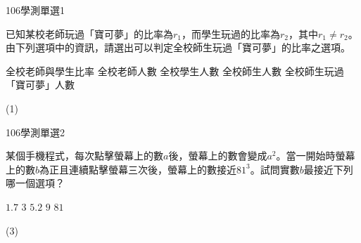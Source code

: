     \begin{QUESTION}
        \begin{ExamInfo}{106}{學測}{單選}{1}
        \end{ExamInfo}
        \begin{ExamAnsRateInfo}{53}{82}{52}{25}
        \end{ExamAnsRateInfo}
        \begin{QBODY}
            已知某校老師玩過「寶可夢」的比率為${{r}_{1}}$，而學生玩過的比率為${{r}_{2}}$，其中${{r}_{1}}\ne {{r}_{2}}$。
            由下列選項中的資訊，請選出可以判定全校師生玩過「寶可夢」的比率之選項。
            \begin{QOPS}
                \QOP 全校老師與學生比率     
                \QOP 全校老師人數
                \QOP 全校學生人數
                \QOP 全校師生人數
                \QOP 全校師生玩過「寶可夢」人數
            \end{QOPS}
        \end{QBODY}
        \begin{QFROMS}
        \end{QFROMS}
        \begin{QTAGS}\end{QTAGS}
        \begin{QANS}
            (1)
        \end{QANS}
        \begin{QSOLLIST}
        \end{QSOLLIST}
        \begin{QEMPTYSPACE}
        \end{QEMPTYSPACE}
    \end{QUESTION}
    \begin{QUESTION}
        \begin{ExamInfo}{106}{學測}{單選}{2}
        \end{ExamInfo}
        \begin{ExamAnsRateInfo}{51}{84}{52}{17}
        \end{ExamAnsRateInfo}
        \begin{QBODY}
            某個手機程式，每次點擊螢幕上的數$a$後，螢幕上的數會變成${{a}^{2}}$。當一開始時螢幕上的數$b$為正且連續點擊螢幕三次後，螢幕上的數接近${{81}^{3}}$。試問實數$b$最接近下列哪一個選項？
			\begin{QOPS}
				\QOP $1.7$      
				\QOP $3$      
				\QOP $5.2$      
				\QOP $9$      
				\QOP $81$
			\end{QOPS}
        \end{QBODY}
        \begin{QFROMS}
        \end{QFROMS}
        \begin{QTAGS}\end{QTAGS}
        \begin{QANS}
            (3)
        \end{QANS}
        \begin{QSOLLIST}
        \end{QSOLLIST}
        \begin{QEMPTYSPACE}
        \end{QEMPTYSPACE}
    \end{QUESTION}
